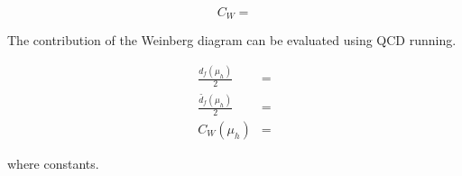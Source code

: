 \begin{equation}
	C_{W} = 
\end{equation}

The contribution of the Weinberg diagram can be evaluated using QCD running.

\begin{align}
	\frac{d_{f}(\mu_{h})}{2} &= \\
	\frac{\tilde{d_{f}}(\mu_{h})}{2} &= \\
	C_{W}(\mu_{h}) &= 
\end{align}

where constants.

\clearpage
